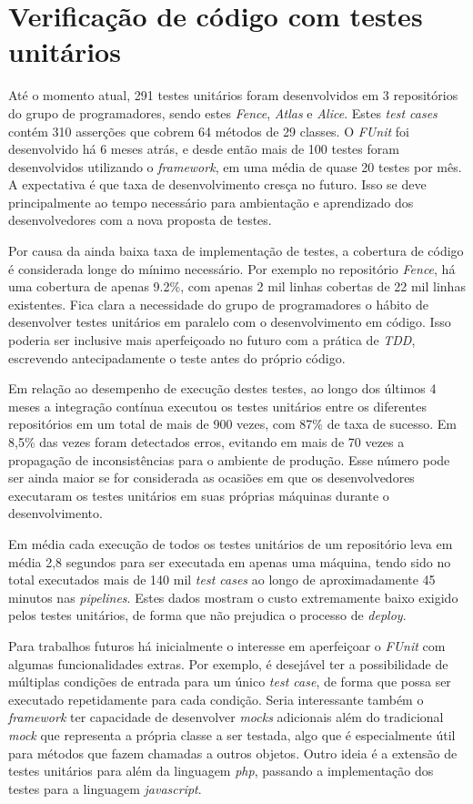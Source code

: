 \hypertarget{fence-unit-test-resultados}{%
\section{Verificação de código com testes unitários}\label{fence-unit-test-resultados}}

Até o momento atual, 291 testes unitários foram desenvolvidos em 3 repositórios do grupo de programadores, sendo estes \emph{Fence}, \emph{Atlas} e \emph{Alice}. Estes \emph{test cases} contém 310 asserções que cobrem 64 métodos de 29 classes. O \emph{FUnit} foi desenvolvido há 6 meses atrás, e desde então mais de 100 testes foram desenvolvidos utilizando o \emph{framework}, em uma média de quase 20 testes por mês. A expectativa é que taxa de desenvolvimento cresça no futuro. Isso se deve principalmente ao tempo necessário para ambientação e aprendizado dos desenvolvedores com a nova proposta de testes.

Por causa da ainda baixa taxa de implementação de testes, a cobertura de código é considerada longe do mínimo necessário. Por exemplo no repositório \emph{Fence}, há uma cobertura de apenas 9.2\%, com apenas 2 mil linhas cobertas de 22 mil linhas existentes. Fica clara a necessidade do grupo de programadores o hábito de desenvolver testes unitários em paralelo com o desenvolvimento em código. Isso poderia ser inclusive mais aperfeiçoado no futuro com a prática de \emph{TDD}, escrevendo antecipadamente o teste antes do próprio código.

Em relação ao desempenho de execução destes testes, ao longo dos últimos 4 meses a integração contínua executou os testes unitários entre os diferentes repositórios em um total de mais de 900 vezes, com 87\% de taxa de sucesso. Em 8,5\% das vezes foram detectados erros, evitando em mais de 70 vezes a propagação de inconsistências para o ambiente de produção. Esse número pode ser ainda maior se for considerada as ocasiões em que os desenvolvedores executaram os testes unitários em suas próprias máquinas durante o desenvolvimento.

Em média cada execução de todos os testes unitários de um repositório leva em média 2,8 segundos para ser executada em apenas uma máquina, tendo sido no total executados mais de 140 mil \emph{test cases} ao longo de aproximadamente 45 minutos nas \emph{pipelines}. Estes dados mostram o custo extremamente baixo exigido pelos testes unitários, de forma que não prejudica o processo de \emph{deploy}.

Para trabalhos futuros há inicialmente o interesse em aperfeiçoar o \emph{FUnit} com algumas funcionalidades extras. Por exemplo, é desejável ter a possibilidade de múltiplas condições de entrada para um único \emph{test case}, de forma que possa ser executado repetidamente para cada condição. Seria interessante também o \emph{framework} ter capacidade de desenvolver \emph{mocks} adicionais além do tradicional \emph{mock} que representa a própria classe a ser testada, algo que é especialmente útil para métodos que fazem chamadas a outros objetos. Outro ideia é a extensão de testes unitários para além da linguagem \emph{php}, passando a implementação dos testes para a linguagem \emph{javascript}.
